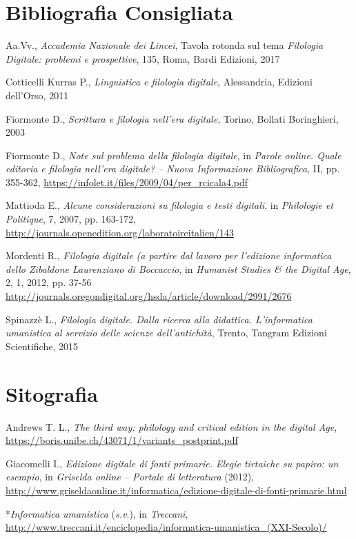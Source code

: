 {{\section*{Bibliografia Consigliata}
{\parindent0pt 
Aa.Vv., \emph{Accademia Nazionale dei Lincei}, Tavola rotonda sul tema
\emph{Filologia Digitale: problemi e prospettive}, 135, Roma, Bardi
Edizioni, 2017

Cotticelli Kurras P., \emph{Linguistica e filologia digitale},
Alessandria, Edizioni dell'Orso, 2011

Fiormonte D., \emph{Scrittura e filologia nell'era digitale}, Torino,
Bollati Boringhieri, 2003

Fiormonte D., \emph{Note sul problema della filologia digitale}, in
\emph{Parole online. Quale editoria e filologia nell'era digitale? --
Nuova Informazione Bibliografica}, II, pp. 355-362,
\url{https://infolet.it/files/2009/04/per_rcicala4.pdf}

Mattioda E., \emph{Alcune considerazioni su filologia e testi digitali},
in \emph{Philologie et Politique}, 7, 2007, pp. 163-172,
\url{http://journals.openedition.org/laboratoireitalien/143}

Mordenti R., \emph{Filologia digitale (a partire dal lavoro per
l'edizione informatica dello Zibaldone Laurenziano di Boccaccio}, in
\emph{Humanist Studies \& the Digital Age}, 2, 1, 2012, pp. 37-56
\url{http://journals.oregondigital.org/hsda/article/download/2991/2676}


Spinazzè L., \emph{Filologia digitale. Dalla ricerca alla didattica.
L'informatica umanistica al servizio delle scienze dell'antichità},
Trento, Tangram Edizioni Scientifiche, 2015
}

\section*{Sitografia}
{\parindent0pt 
Andrews T. L., \emph{The third way: philology and critical edition in
the digital Age},
\url{https://boris.unibe.ch/43071/1/variants_postprint.pdf}

Giacomelli I., \emph{Edizione digitale di fonti primarie. Elegie
tirtaiche su papiro: un esempio}, in \emph{Griselda online -- Portale di
letteratura} (2012),
\url{http://www.griseldaonline.it/informatica/edizione-digitale-di-fonti-primarie.html}

*\emph{Informatica umanistica} (\emph{s.v}.), in \emph{Treccani},
\url{http://www.treccani.it/enciclopedia/informatica-umanistica_(XXI-Secolo)/}

}}}
